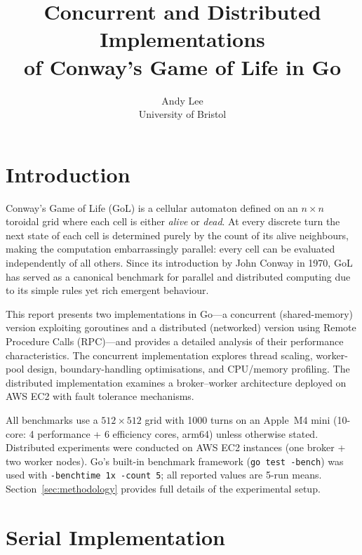 \documentclass[10pt,twocolumn]{article}
\title{\vspace{-1.0cm}\textbf{Concurrent and Distributed Implementations\\of Conway's Game of Life in Go}}
\author{Andy Lee\\University of Bristol}
\date{}
\begin{document}
\maketitle
\vspace{-0.6cm}

\section{Introduction}\label{sec:intro}

Conway's Game of Life (GoL) is a cellular automaton defined on an $n \times n$ toroidal grid where each cell is either \emph{alive} or \emph{dead}.
At every discrete turn the next state of each cell is determined purely by the count of its alive neighbours, making the computation embarrassingly parallel: every cell can be evaluated independently of all others.
Since its introduction by John Conway in 1970, GoL has served as a canonical benchmark for parallel and distributed computing due to its simple rules yet rich emergent behaviour.

This report presents two implementations in Go---a concurrent (shared-memory) version exploiting goroutines and a distributed (networked) version using Remote Procedure Calls (RPC)---and provides a detailed analysis of their performance characteristics.
The concurrent implementation explores thread scaling, worker-pool design, boundary-handling optimisations, and CPU/memory profiling.
The distributed implementation examines a broker--worker architecture deployed on AWS EC2 with fault tolerance mechanisms.

All benchmarks use a $512\times512$ grid with 1000 turns on an Apple~M4 mini (10-core: 4 performance + 6 efficiency cores, arm64) unless otherwise stated.
Distributed experiments were conducted on AWS EC2 instances (one broker + two worker nodes).
Go's built-in benchmark framework (\texttt{go test -bench}) was used with \texttt{-benchtime 1x -count 5}; all reported values are 5-run means.
Section~\ref{sec:methodology} provides full details of the experimental setup.

\section{Serial Implementation}\label{sec:serial}
\end{document}
